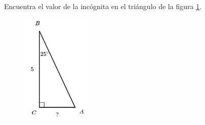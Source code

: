 \question[15]  Encuentra el valor de la incógnita en el triángulo de la figura \ref{fig:lados_functrig_20}.
\begin{figure}[H]
    \begin{center}
        \includegraphics[width=0.3\textwidth]{../images/lados_functrig_20.png}
    \end{center}
    \caption{}
    \label{fig:lados_functrig_20}
\end{figure}